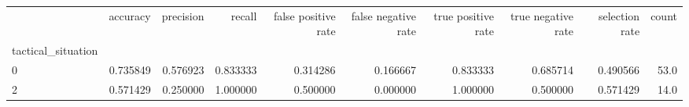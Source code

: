 \begin{tabular}{lrrrrrrrrr}
\toprule
{} &  accuracy &  precision &    recall &  false positive rate &  false negative rate &  true positive rate &  true negative rate &  selection rate &  count \\
tactical\_situation &           &            &           &                      &                      &                     &                     &                 &        \\
\midrule
0                  &  0.735849 &   0.576923 &  0.833333 &             0.314286 &             0.166667 &            0.833333 &            0.685714 &        0.490566 &   53.0 \\
2                  &  0.571429 &   0.250000 &  1.000000 &             0.500000 &             0.000000 &            1.000000 &            0.500000 &        0.571429 &   14.0 \\
\bottomrule
\end{tabular}
